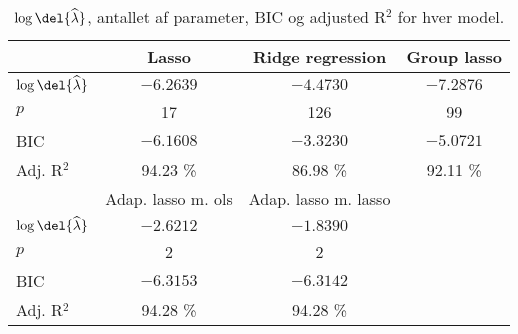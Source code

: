\begin{table}
\center
\begin{tabular}{lccc} 
\toprule
& \multicolumn{1}{c}{Lasso} & \multicolumn{1}{c}{Ridge regression}  &  \multicolumn{1}{c}{Group lasso}\\ \midrule
$\log \del{\widehat{\lambda}}$ & $-6.2639$ & $-4.4730$  & $-7.2876$ \\
$p$ & 17 & 126 & 99 \\
BIC & $-6.1608 $& $-3.3230$ & $-5.0721$  \\
Adj. R$^2$ & 94.23 \% & 86.98  \%   & 92.11 \%  \\ \bottomrule \toprule
& Adap. lasso m. ols & Adap. lasso m. lasso \\ \midrule
$\log \del{ \widehat{\lambda}}$ &  $-2.6212$& $-1.8390$ \\
$p$ & 2&2 \\
BIC &  $-6.3153$&$-6.3142$ \\
Adj. R$^2$ & 94.28 \% &  94.28 \% \\ \bottomrule
 \end{tabular}
\caption{$\log \del{ \widehat\lambda}$, antallet af parameter, BIC og adjusted R$^2$ for hver model.} \label{tab:bic_lambda}
\end{table}